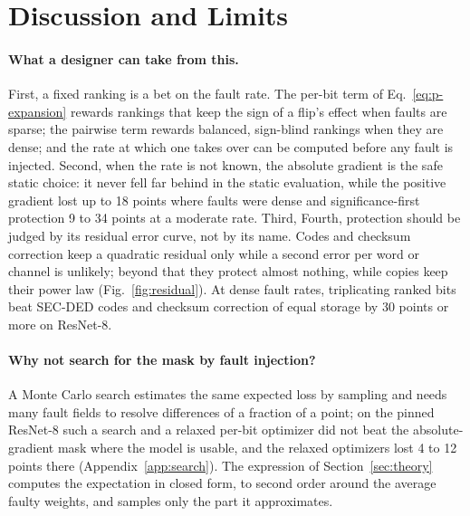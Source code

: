 \section{Discussion and Limits}\label{sec:discussion}
\paragraph{What a designer can take from this.} First, a fixed ranking is a bet on the fault rate. The per-bit term of Eq.~\eqref{eq:p-expansion} rewards rankings that keep the sign of a flip's effect when faults are sparse; the pairwise term rewards balanced, sign-blind rankings when they are dense; and the rate at which one takes over can be computed before any fault is injected.  Second, when the rate is not known, the absolute gradient is the safe static choice: it never fell far behind in the static evaluation, while the positive gradient lost up to 18 points where faults were dense and significance-first protection 9 to 34 points at a moderate rate. Third,  Fourth, protection should be judged by its residual error curve, not by its name. Codes and checksum correction keep a quadratic residual only while a second error per word or channel is unlikely; beyond that they protect almost nothing, while copies keep their power law (Fig.~\ref{fig:residual}). At dense fault rates, triplicating ranked bits beat SEC-DED codes and checksum correction of equal storage by 30 points or more on ResNet-8.

\paragraph{Why not search for the mask by fault injection?} A Monte Carlo search estimates the same expected loss by sampling and needs many fault fields to resolve differences of a fraction of a point; on the pinned ResNet-8 such a search and a relaxed per-bit optimizer did not beat the absolute-gradient mask where the model is usable, and the relaxed optimizers lost 4 to 12 points there (Appendix~\ref{app:search}). The expression of Section~\ref{sec:theory} computes the expectation in closed form, to second order around the average faulty weights, and samples only the part it approximates. 

